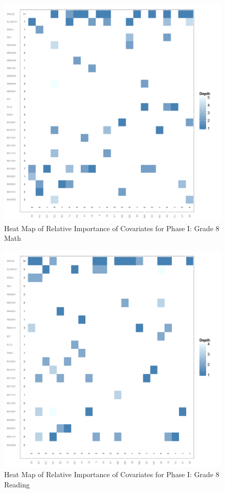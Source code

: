 \documentclass[letterpaper,12p,twoside]{article} %
\begin{document}
{\begin{figure}[h]
\begin{center}
\includegraphics[width=\textwidth]{../Figures2009/g8math-mlpsa-ctree-heat.pdf}
\caption{Heat Map of Relative Importance of Covariates for Phase I: Grade 8 Math}
\label{fig:g8math-mlpsa-ctree-heat}
\end{center}
\end{figure}

\begin{figure}[h]
\begin{center}
\includegraphics[width=\textwidth]{../Figures2009/g8read-mlpsa-ctree-heat.pdf}
\caption{Heat Map of Relative Importance of Covariates for Phase I: Grade 8 Reading}
\label{fig:g8read-mlpsa-ctree-heat}
\end{center}
\end{figure}


}
\end{document}
